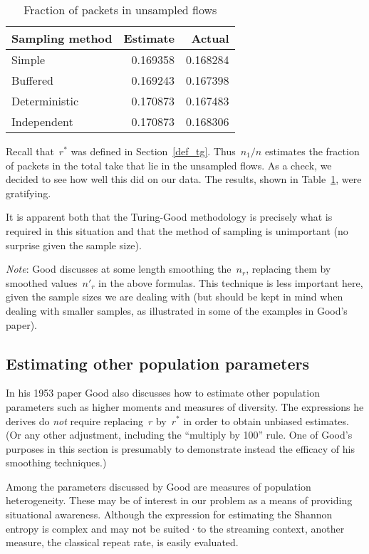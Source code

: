 \documentclass{paper}
\begin{document}
\begin{table}
\begin{center}
\begin{tabular}{l r r}
Sampling method & Estimate & Actual   \\
\midrule
Simple          & 0.169358 & 0.168284 \\
Buffered        & 0.169243 & 0.167398 \\
Deterministic   & 0.170873 & 0.167483 \\
Independent     & 0.170873 & 0.168306 \\
\end{tabular}
\caption{Fraction of packets in unsampled flows}
\label{uns_flows}
\end{center}
\end{table}

Recall that~$r^*$ was defined in Section~\ref{def_tg}. Thus~$n_1/n$ estimates
the fraction of packets in the total take that lie in the unsampled flows. As a
check, we decided to see how well this did on our data. The results, shown in
Table~\ref{uns_flows}, were gratifying.

It is apparent both that the Turing-Good methodology is precisely what is
required in this situation and that the method of sampling is unimportant (no
surprise given the sample size).

\emph{Note}: Good discusses at some length smoothing the~$n_r$, replacing them
by smoothed values~$n'_r$ in the above formulas. This technique is less
important here, given the sample sizes we are dealing with (but should be kept
in mind when dealing with smaller samples, as illustrated in some of the
examples in Good's paper).

\subsection{Estimating other population parameters}

In his 1953 paper Good also discusses how to estimate other population
parameters such as higher moments and measures of diversity. The expressions he
derives do \emph{not} require replacing~$r$ by~$r^*$ in order to obtain unbiased
estimates.  (Or any other adjustment, including the ``multiply by 100'' rule.
One of Good's purposes in this section is presumably to demonstrate instead the
efficacy of his smoothing techniques.)

Among the parameters discussed by Good are measures of population heterogeneity.
These may be of interest in our problem as a means of providing situational
awareness. Although the expression for estimating the Shannon entropy is complex
and may not be suited·to the streaming context, another measure, the classical
repeat rate, is easily evaluated.
\end{document}
